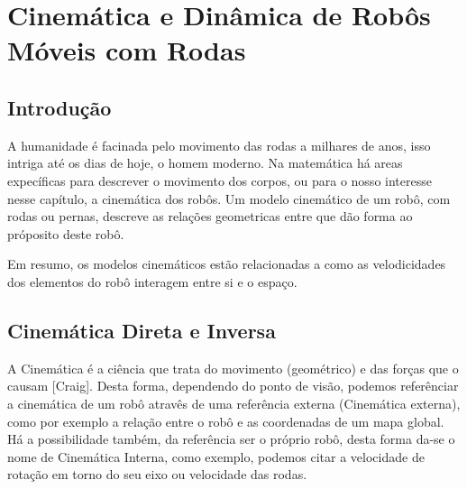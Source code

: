 \chapter{Cinemática e Dinâmica de Robôs Móveis com Rodas}


\section{Introdução}\label{intro}

A humanidade é facinada pelo movimento das rodas a milhares de anos, isso intriga até os dias de hoje, o homem moderno.
Na matemática há areas expecíficas para descrever o movimento dos corpos, ou para o nosso interesse nesse capítulo, a cinemática dos robôs. 
Um modelo cinemático de um robô, com rodas ou pernas, descreve as relações geometricas entre que dão forma ao próposito deste robô.

Em resumo, os modelos cinemáticos estão relacionadas a como as velodicidades dos elementos do robô interagem entre si e o espaço.


\section{Cinemática Direta e Inversa}\label{intro-ch1}

A Cinemática é a ciência que trata do movimento (geométrico) e das forças que o causam [Craig]. Desta forma, dependendo do ponto de visão,
podemos referênciar a cinemática de um robô atravês de uma referência externa (Cinemática externa), como por exemplo a relação entre o robô e
as coordenadas de um mapa global. Há a possibilidade também, da referência ser o próprio robô, desta forma da-se o nome de
Cinemática Interna, como exemplo, podemos citar a velocidade de rotação em torno do seu eixo ou velocidade das rodas.


